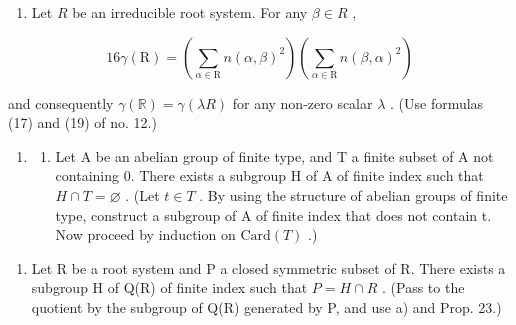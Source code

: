 \begin{enumerate}
\item
  Let \(R\) be an irreducible root system. For any \(\beta \in R\) ,
\end{enumerate}

\[
16 \gamma (\mathrm{R}) = (\sum_ {\alpha \in \mathrm{R}} n (\alpha , \beta) ^ {2}) (\sum_ {\alpha \in \mathrm{R}} n (\beta , \alpha) ^ {2})
\]

and consequently \(\gamma (\mathbb{R}) = \gamma (\lambda R)\) for any non-zero scalar \(\lambda\) . (Use formulas (17) and (19) of no. 12.)

\begin{enumerate}
\def\labelenumi{\arabic{enumi})}
\setcounter{enumi}{5}
\tightlist
\item
  \begin{enumerate}
  \def\labelenumii{\alph{enumii})}
  \tightlist
  \item
    Let A be an abelian group of finite type, and T a finite subset of A not containing 0. There exists a subgroup H of A of finite index such that \(H \cap T = \varnothing\) . (Let \(t \in T\) . By using the structure of abelian groups of finite type, construct a subgroup of A of finite index that does not contain t. Now proceed by induction on \(\text{Card}(T)\) .)
  \end{enumerate}
\end{enumerate}

\begin{enumerate}
\def\labelenumi{\alph{enumi})}
\setcounter{enumi}{1}
\tightlist
\item
  Let R be a root system and P a closed symmetric subset of R. There exists a subgroup H of Q(R) of finite index such that \(P = H \cap R\) . (Pass to the quotient by the subgroup of Q(R) generated by P, and use a) and Prop. 23.)
\end{enumerate}

